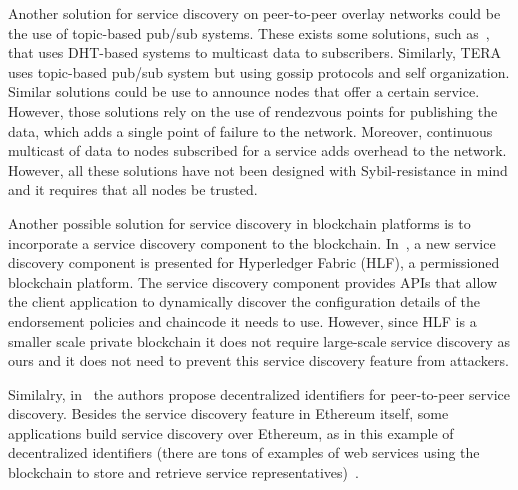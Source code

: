 Another solution for service discovery on peer-to-peer overlay networks could be the use of topic-based pub/sub systems. 
These exists some solutions,  such as~\cite{scribe,poldercast,banno2015},  that uses DHT-based systems to multicast data to subscribers.
Similarly,  TERA~\cite{baldoni2007tera} uses topic-based pub/sub system
but using gossip protocols and self organization.  
Similar solutions could be use to announce nodes that offer a certain service.
However,  those solutions rely on the use of rendezvous points for publishing the data,  which adds a single point of failure to the network.
Moreover,  continuous multicast of data to nodes subscribed for a service adds overhead to the network.
However,  all these solutions have not been designed with Sybil-resistance in mind and it requires that all nodes be trusted.



Another possible solution for service discovery in blockchain platforms is to incorporate a service discovery component to the blockchain. 
In~\cite{manevich2019endorsement}, a new service discovery component is presented for  Hyperledger Fabric (HLF),  a permissioned blockchain platform.
The service discovery component provides APIs that allow the client application to dynamically discover the configuration details of the endorsement policies and chaincode it needs to use.
However, since HLF is a smaller scale private blockchain it does not require large-scale service discovery as ours and it does not need to prevent this service discovery feature from attackers.

Similalry,  in~\cite{farmer2021decentralized} the authors propose decentralized identifiers for peer-to-peer service discovery.
Besides the service discovery feature in Ethereum itself, some applications build service discovery over Ethereum, as in this example of decentralized identifiers (there are tons of examples of web services using the blockchain to store and retrieve service representatives)~\cite{keizer2021flock}.


